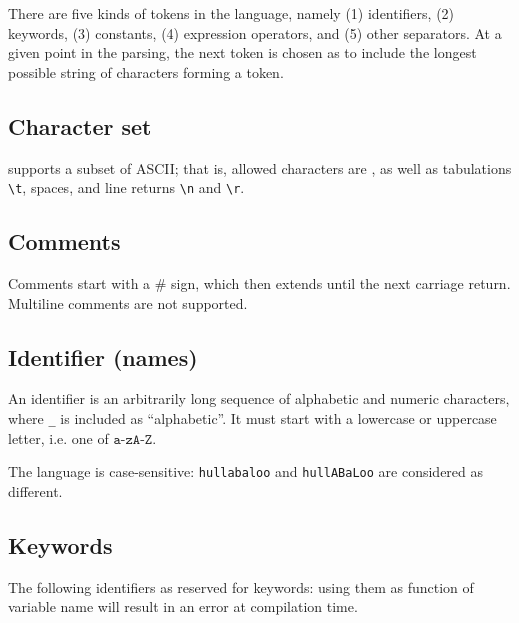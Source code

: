 There are five kinds of tokens in the language, namely \textsf{(1)} identifiers, \textsf{(2)} keywords, \textsf{(3)} constants, \textsf{(4)} expression operators, and \textsf{(5)} other separators. At a given point in the parsing, the next token is chosen as to include the longest possible string of characters forming a token.

\subsection{Character set}
\QL supports a subset of ASCII; that is, allowed characters are
, as well as tabulations \texttt{\textbackslash{}t}, spaces, and line returns \texttt{\textbackslash{}n} and \texttt{\textbackslash{}r}.
\subsection{Comments}
Comments start with a \# sign, which then extends until the next carriage return. Multiline comments are not supported.

\subsection{Identifier (names)}
An identifier is an arbitrarily long sequence of alphabetic and numeric characters, where \texttt{\_} is included as ``alphabetic''. It must start with a lowercase or uppercase letter, i.e. one of $\texttt{a-zA-Z}$.

\noindent The language is case-sensitive: \texttt{hullabaloo} and \texttt{hullABaLoo} are considered as different.

\subsection{Keywords}
The following identifiers as reserved for keywords: using them as function of variable name will result in an error at compilation time.

